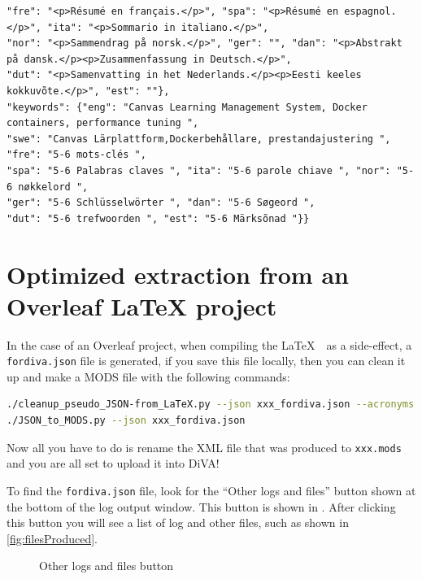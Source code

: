 \begin{lstlisting}
"fre": "<p>Résumé en français.</p>", "spa": "<p>Résumé en espagnol.</p>", "ita": "<p>Sommario in italiano.</p>",
"nor": "<p>Sammendrag på norsk.</p>", "ger": "", "dan": "<p>Abstrakt på dansk.</p><p>Zusammenfassung in Deutsch.</p>",
"dut": "<p>Samenvatting in het Nederlands.</p><p>Eesti keeles kokkuvõte.</p>", "est": ""},
"keywords": {"eng": "Canvas Learning Management System, Docker containers, performance tuning ",
"swe": "Canvas Lärplattform,Dockerbehållare, prestandajustering ", "fre": "5-6 mots-clés ",
"spa": "5-6 Palabras claves ", "ita": "5-6 parole chiave ", "nor": "5-6 nøkkelord ",
"ger": "5-6 Schlüsselwörter ", "dan": "5-6 Søgeord ",
"dut": "5-6 trefwoorden ", "est": "5-6 Märksõnad "}}
\end{lstlisting}
\FloatBarrier

\section{Optimized extraction from an Overleaf LaTeX project}
\label{sec:optimizeJSONToMods}
In the case of an Overleaf project, when compiling the \LaTeX~\ as a side-effect, a \texttt{fordiva.json} file is generated, if you save this file locally, then you can clean it up and make a MODS file with the following commands:
\begin{lstlisting}[language={bash}, caption={cleanup\_pseudo\_JSON-from\_LaTeX and JSON\_to\_MODS.p},label=lst:cleanPseudoJSONandConvertToMODS]
./cleanup_pseudo_JSON-from_LaTeX.py --json xxx_fordiva.json --acronyms acronyms.tex
./JSON_to_MODS.py --json xxx_fordiva.json
\end{lstlisting}

Now all you have to do is rename the XML file that was produced to \texttt{xxx.mods} and you are all set to upload it into DiVA!

To find the \texttt{fordiva.json} file, look for the “Other logs and files” button shown at the bottom of the log output window. This button is shown in . After clicking this button you will see a list of log and other files, such as shown in \ref{fig:filesProduced}.
	
\begin{figure}[!ht]
  \begin{center}
  \end{center}
  \caption{Other logs and files button}
  \label{fig:otherLogfiles}
\end{figure}

